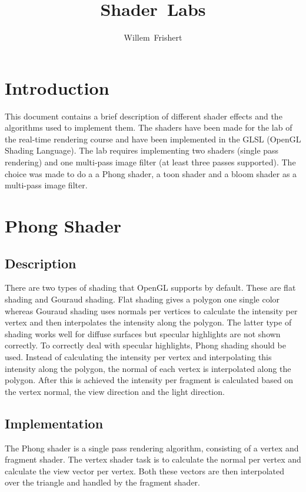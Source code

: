 \documentclass[a4paper,12pt]{article}
\author{Willem~Frishert}
\title{Shader~Labs}
\begin{document}
\pagestyle{headings}
\maketitle

\section{Introduction}
\label{sec:Introduction}
This document contains a brief description of different shader effects and the algorithms used to implement them. The shaders have been made for the lab of the real-time rendering course and have been implemented in the GLSL (OpenGL Shading Language). The lab requires implementing two shaders (single pass rendering) and one multi-pass image filter (at least three passes supported). The choice was made to do a a Phong shader, a toon shader and a bloom shader as a multi-pass image filter.

\section{Phong Shader}
\label{sec:PhongShader}
\subsection{Description}
\label{sec:Description}

There are two types of shading that OpenGL supports by default. These are flat shading and Gouraud shading. Flat shading gives a polygon one single color whereas Gouraud shading uses normals per vertices to calculate the intensity per vertex and then interpolates the intensity along the polygon. The latter type of shading works well for diffuse surfaces but specular highlights are not shown correctly. To correctly deal with specular highlights, Phong shading should be used. Instead of calculating the intensity per vertex and interpolating this intensity along the polygon, the normal of each vertex is interpolated along the polygon. After this is achieved the intensity per fragment is calculated based on the vertex normal, the view direction and the light direction.


\subsection{Implementation}
\label{sec:ImplementationPhongShader}

The Phong shader is a single pass rendering algorithm, consisting of a vertex and fragment shader. The vertex shader task is to calculate the normal per vertex and calculate the view vector per vertex. Both these vectors are then interpolated over the triangle and handled by the fragment shader.
\end{document}
